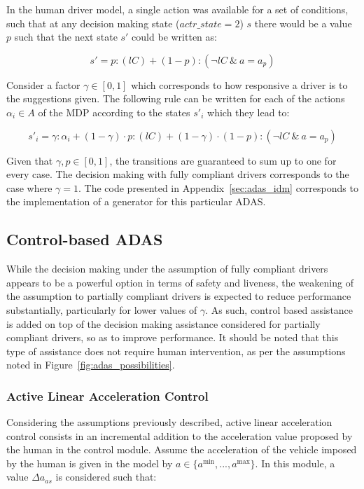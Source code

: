In the human driver model, a single action was available for a set of conditions, such that at any decision making state ($actr\_state = 2$) $s$ there would be a value $p$ such that the next state $s'$ could be written as:

\begin{equation}
s' = p: (lC) + (1 - p): (\neg lC \:\&\: a = a_p)
\end{equation}

Consider a factor $\gamma \in [0,1]$ which corresponds to how responsive a driver is to the suggestions given. The following rule can be written for each of the actions $\alpha_i \in A$ of the MDP according to the states $s'_i$ which they lead to:

\begin{equation}
s'_i = \gamma: \alpha_i + (1-\gamma)\cdot p:(lC) + (1-\gamma)\cdot (1-p):(\neg lC \:\&\: a = a_p)
\end{equation}

Given that $\gamma, p \in [0,1]$, the transitions are guaranteed to sum up to one for every case. The decision making with fully compliant drivers corresponds to the case where $\gamma = 1$. The code presented in Appendix~\ref{sec:adas_idm} corresponds to the implementation of a generator for this particular ADAS.

\subsection{Control-based ADAS}

While the decision making under the assumption of fully compliant drivers appears to be a powerful option in terms of safety and liveness, the weakening of the assumption to partially compliant drivers is expected to reduce performance substantially, particularly for lower values of $\gamma$. As such, control based assistance is added on top of the decision making assistance considered for partially compliant drivers, so as to improve performance. It should be noted that this type of assistance does not require human intervention, as per the assumptions noted in Figure~\ref{fig:adas_possibilities}.

\subsubsection{Active Linear Acceleration Control}

Considering the assumptions previously described, active linear acceleration control consists in an incremental addition to the acceleration value proposed by the human in the control module. Assume the acceleration of the vehicle imposed by the human is given in the model by $a \in \{a^{\min},...,a^{\max}\}$. In this module, a value $\Delta a_{as}$ is considered such that:


